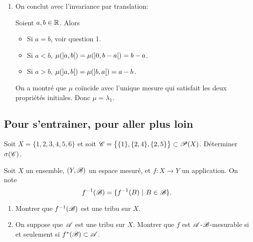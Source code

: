 {\begin{nntd-sol}[]
\begin{enumerate}
            On a montré que \(\mu(\fo{0,x})=x\) pour tout \(x\in\R_+^*\).

            \item On conclut avec l'invariance par translation:

            Soient \(a,b\in\mathbb{R}\). Alors
            \begin{itemize}
                \item Si \(a=b\), voir question 1.
                \item Si \(a<b\), \(\mu(\mathopen{}\left]a,b\right[\mathclose{})=\mu(\mathopen{}\left]0,b-a\right[\mathclose{})=b-a\).
                \item Si \(a>b\), \(\mu(\mathopen{}\left]a,b\right[\mathclose{})=\mu(\mathopen{}\left]b,a\right[\mathclose{})=a-b\).
            \end{itemize}
            On a montré que \(\mu\) coïncide avec l'unique mesure qui satisfait les deux propriétés initiales.
            Donc \(\mu=\lambda_1\).
        \end{enumerate}

    \end{nntd-sol}
}{}

%
\subsection{Pour s'entrainer, pour aller plus loin} 
%

%

\begin{td-exo}
    Soit \(X=\{1,2,3,4,5,6\}\) et soit \(\mathscr{C}=\bigl\{\{1\},\{2,4\},\{2,5\}\bigr\}\subset\mathscr{P}(X)\). Déterminer \(\sigma(\mathscr{C})\).
\end{td-exo}

\begin{td-exo}
    Soit \(X\) un ensemble, \((Y,\mathscr{B})\) un espace mesuré, et \(f:X\to Y\) un application. On note
    \[
        f^{-1}(\mathscr{B})=\{f^{-1}(B)\ |\ B\in\mathscr{B}\}.
    \]
    \begin{enumerate}
        \item Montrer que \(f^{-1}(\mathscr{B})\) est une tribu sur \(X\).
        \item On suppose que \(\mathscr{A}\) est une tribu sur \(X\). Montrer que \(f\) est \(\mathscr{A}\)-\(\mathscr{B}\)-mesurable si et seulement si \(f^*(\mathscr{B})\subset\mathscr{A}\).
    \end{enumerate}
\end{td-exo}

